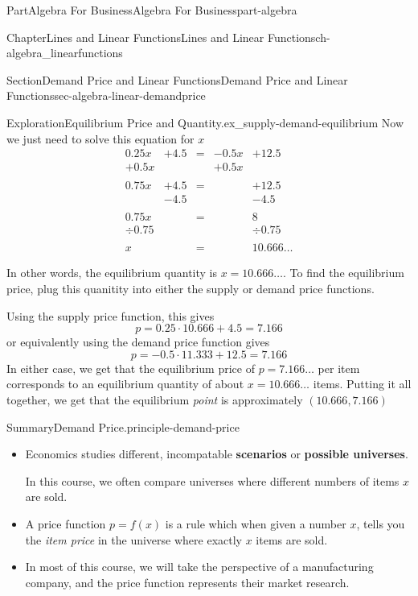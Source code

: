 \documentclass{tufte-book}
\newcommand{\terminology}[1]{\textbf{#1}}
\numberwithin{equation}{chapter}
\newcommand{\amp}{&}
\begin{document}
\begin{partptx}{Part}{Algebra For Business}{}{Algebra For Business}{}{}{part-algebra}
\begin{chapterptx}{Chapter}{Lines and Linear Functions}{}{Lines and Linear Functions}{}{}{ch-algebra_linearfunctions}
\begin{sectionptx}{Section}{Demand Price and Linear Functions}{}{Demand Price and Linear Functions}{}{}{sec-algebra-linear-demandprice}
\begin{exploration}{Exploration}{Equilibrium Price and Quantity.}{ex_supply-demand-equilibrium}
Now we just need to solve this equation for \(x\)%
\begin{align*}
0.25x \amp+ 4.5\amp = \amp-0.5x \amp+ 12.5 \\
+0.5x \amp     \amp   \amp+0.5x \amp       \\
\amp \amp \amp \amp\\
0.75x \amp+ 4.5\amp = \amp      \amp+ 12.5 \\
\amp- 4.5\amp   \amp      \amp- 4.5  \\
\amp \amp \amp \amp\\
0.75x \amp     \amp = \amp      \amp 8   \\
\div0.75\amp    \amp   \amp      \amp \div 0.75   \\
\amp \amp \amp \amp\\
x \amp         \amp = \amp     \amp 10.666\dots  
\end{align*}
%
\par
In other words, the equilibrium quantity is \(x=10.666\dots\). To find the equilibrium price, plug this quanitity into either the supply or demand price functions.%
\par
Using the supply price function, this gives%
\begin{equation*}
p = 0.25\cdot 10.666 + 4.5 = 7.166
\end{equation*}
or equivalently using the demand price function gives%
\begin{equation*}
p =  -0.5\cdot 11.333 + 12.5 = 7.166
\end{equation*}
In either case, we get that the equilibrium price of \(p=7.166\dots\) \textdollar{} per item corresponds to an equilibrium quantity of about \(x=10.666\dots\) items.  Putting it all together, we get that the equilibrium \emph{point} is approximately \((10.666,7.166)\)%
\end{exploration}%
\begin{assemblage}{Summary}{Demand Price.}{principle-demand-price}%
%
\begin{itemize}[label=\textbullet]
\item{}Economics studies different, incompatable \terminology{scenarios} or \terminology{possible universes}.%
\par
In this course, we often compare universes where different numbers of items \(x\) are sold.%
\item{}A price function \(p = f(x)\) is a rule which when given a number \(x\), tells you the \emph{item price} in the universe where exactly \(x\) items are sold.%
\item{}In most of this course, we will take the perspective of a manufacturing company, and the price function represents their market research.%

\end{itemize}
\end{assemblage}
\end{sectionptx}
\end{chapterptx}
\end{partptx}
\end{document}
